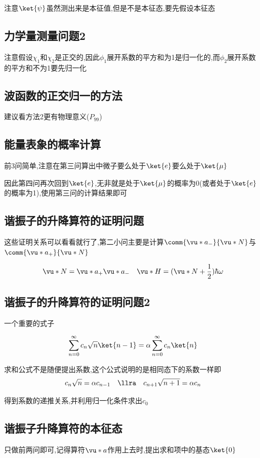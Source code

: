             注意$\ket{\psi}$虽然测出来是本征值,但是不是本征态,要先假设本征态


        \subsection{力学量测量问题2}
            注意假设$\chi_{1}$和$\chi_{2}$是正交的,因此$\phi_{1}$展开系数的平方和为1是归一化的,而$\phi_{2}$展开系数的平方和不为1要先归一化

        \subsection{波函数的正交归一的方法}
            建议看方法2更有物理意义($P_{99}$)

        \subsection{能量表象的概率计算}
            前3问简单,注意在第三问算出中微子要么处于$\ket{e}$要么处于$\ket{\mu}$

            因此第四问再次回到$\ket{e}$,无非就是处于$\ket{\mu}$的概率为0(或者处于$\ket{e}$的概率为1),使用第三问的计算结果即可

        \subsection{谐振子的升降算符的证明问题}
            这些证明关系可以看看就行了,第二小问主要是计算$\comm{\vu*{a}_{-}}{\vu*{N}}$与$\comm{\vu*{a}_{+}}{\vu*{N}}$

            $$ \vu*{N} = \vu*{a}_{+} \vu*{a}_{-} \quad \vu*{H} = (\vu*{N} + \frac{1}{2}) \hbar \omega $$
        \subsection{谐振子的升降算符的证明问题2}
            一个重要的式子

            $$ \sum_{n=0}^{\infty} c_{n} \sqrt{n} \ket{n-1} = \alpha \sum_{n=0}^{\infty} c_{n} \ket{n} $$

            求和公式不是随便提出系数,这个公式说明的是相同态下的系数一样即
            $$ c_{n} \sqrt{n}  = \alpha c_{n-1} \quad  \llra \quad c_{n+1} \sqrt{n+1} = \alpha c_{n} $$

            得到系数的递推关系,并利用归一化条件求出$c_{0}$

        \subsection{谐振子升降算符的本征态}
            只做前两问即可,记得算符$\vu*{a}$作用上去时,提出求和项中的基态$\ket{0}$
        

